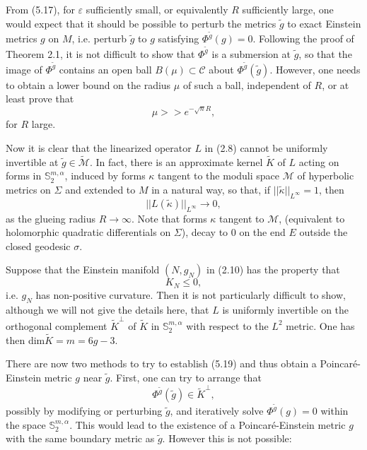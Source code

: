 \documentclass[11pt,amsfonts]{amsart}
\begin{document}
\medskip

 From (5.17), for $\varepsilon$ sufficiently small, or equivalently $R$ sufficiently 
large, one would expect that it should be possible to perturb the 
metrics $\widetilde g$ to exact Einstein metrics $g$ on $M$, i.e. perturb 
$\widetilde g$ to $g$ satisfying $\Phi^{\widetilde g}(g) = 0$. Following 
the proof of Theorem 2.1, it is not difficult to show that 
$\Phi^{\widetilde g}$ is a submersion at $\widetilde g$, so that the 
image of $\Phi^{\widetilde g}$ contains an open ball $B(\mu) \subset {\mathcal C}$ 
about $\Phi^{\widetilde g}(\widetilde g)$. However, one needs to obtain a lower 
bound on the radius $\mu$ of such a ball, independent of $R$, or at 
least prove that 
\begin{equation} \label{e5.19}
\mu  >> e^{-\sqrt{n}R}, 
\end{equation}
for $R$ large. 

 Now it is clear that the linearized operator $L$ in (2.8) cannot be 
uniformly invertible at $\widetilde g \in\widetilde{\mathcal M}$. In fact, 
there is an approximate kernel $\widetilde K$ of $L$ acting on forms in 
${\mathbb S}_{2}^{m,\alpha}$, induced by forms $\kappa$ tangent to the 
moduli space ${\mathcal M}$ of hyperbolic metrics on $\Sigma$ and extended 
to $M$ in a natural way, so that, 
if $||\widetilde \kappa||_{L^{\infty}} = 1$, then 
\begin{equation} \label{e5.20}
||L(\widetilde \kappa)||_{L^{\infty}} \rightarrow  0, 
\end{equation}
as the glueing radius $R \rightarrow  \infty$. Note that forms $\kappa$ 
tangent to ${\mathcal M}$, (equivalent to holomorphic quadratic 
differentials on $\Sigma$), decay to 0 on the end $E$ outside the closed 
geodesic $\sigma$. 

  Suppose that the Einstein manifold $(N, g_{N})$ in (2.10) has the 
property that 
\begin{equation} \label{e5.21}
K_{N} \leq  0, 
\end{equation}
i.e. $g_{N}$ has non-positive curvature. Then it is not particularly 
difficult to show, although we will not give the details here, that $L$ 
is uniformly invertible on the orthogonal complement 
$\widetilde K^{\perp}$ of $\widetilde K$ in ${\mathbb S}_{2}^{m,\alpha}$ with 
respect to the $L^{2}$ metric. One has then dim$\widetilde K = m = 6g-3$. 

 There are now two methods to try to establish (5.19) and thus obtain a 
Poincar\'e-Einstein metric $g$ near $\widetilde g$. First, one can try to 
arrange that 
\begin{equation} \label{e5.22}
\Phi^{\widetilde g}(\widetilde g) \in  \widetilde K^{\perp}, 
\end{equation}
possibly by modifying or perturbing $\widetilde g$, and iteratively solve 
$\Phi^{\widetilde g}(g) = 0$ within the space ${\mathbb S}_{2}^{m,\alpha}$. 
This would lead to the existence of a Poincar\'e-Einstein metric $g$ with 
the same boundary metric as $\widetilde g$. However this is not possible: 
\end{document}
